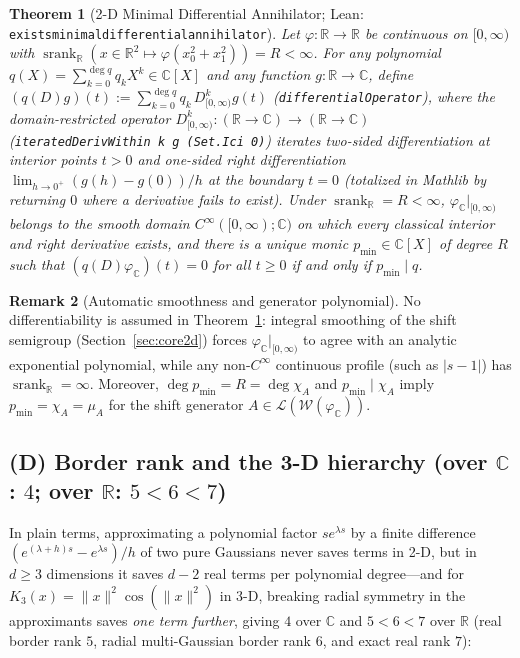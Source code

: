 \documentclass[11pt,a4paper]{article}
\theoremstyle{plain}
\newtheorem{theorem}{Theorem}[section]
\theoremstyle{definition}
\newtheorem{remark}[theorem]{Remark}
\newcommand{\R}{\mathbb{R}}
\newcommand{\C}{\mathbb{C}}
\DeclareMathOperator{\srank}{srank}
\DeclareRobustCommand{\leanid}[1]{{\def\_{\textunderscore\allowbreak}\texttt{#1}}}
\begin{document}
\begin{theorem}[2-D Minimal Differential Annihilator; Lean: \leanid{exists\_minimal\_differential\_annihilator}]\label{thm:annihilator}
Let $\varphi : \R \to \R$ be continuous on $[0,\infty)$ with $\srank_{\R}(x \in \R^2 \mapsto \varphi(x_0^2 + x_1^2)) = R < \infty$. For any polynomial $q(X) = \sum_{k=0}^{\deg q} q_k X^k \in \C[X]$ and any function $g : \R \to \C$, define $(q(D)g)(t) := \sum_{k=0}^{\deg q} q_k\, D^k_{[0,\infty)} g(t)$ (\leanid{differentialOperator}), where the domain-restricted operator $D^k_{[0,\infty)} : (\R \to \C) \to (\R \to \C)$ (\texttt{iterated\-Deriv\-Within k g (Set.Ici 0)}) iterates two-sided differentiation at interior points $t > 0$ and \emph{one-sided right differentiation} $\lim_{h \to 0^+}(g(h) - g(0))/h$ at the boundary $t = 0$ (totalized in Mathlib by returning $0$ where a derivative fails to exist). Under $\srank_{\R} = R < \infty$, $\varphi_{\C}|_{[0,\infty)}$ belongs to the smooth domain $C^\infty([0,\infty); \C)$ on which every classical interior and right derivative exists, and there is a unique monic $p_{\min} \in \C[X]$ of degree $R$ such that $(q(D)\varphi_{\C})(t) = 0$ for all $t \ge 0$ if and only if $p_{\min} \mid q$.
\end{theorem}

\begin{remark}[Automatic smoothness and generator polynomial]\label{rem:annihilator_gen}
No differentiability is assumed in Theorem~\ref{thm:annihilator}: integral smoothing of the shift semigroup (Section~\ref{sec:core2d}) forces $\varphi_{\C}|_{[0,\infty)}$ to agree with an analytic exponential polynomial, while any non-$C^\infty$ continuous profile (such as $|s - 1|$) has $\srank_{\R} = \infty$. Moreover, $\deg p_{\min} = R = \deg\chi_A$ and $p_{\min} \mid \chi_A$ imply $p_{\min} = \chi_A = \mu_A$ for the shift generator $A \in \mathcal{L}(\mathcal{W}(\varphi_{\C}))$.
\end{remark}

\subsection{(D) Border rank and the 3-D hierarchy (over \texorpdfstring{$\C$: $4$; over $\R$: $5 < 6 < 7$}{C: 4; over R: 5 < 6 < 7})}\label{sec:res_border}

In plain terms, approximating a polynomial factor $s e^{\lambda s}$ by a finite difference $(e^{(\lambda+h)s} - e^{\lambda s})/h$ of two pure Gaussians never saves terms in 2-D, but in $d \ge 3$ dimensions it saves $d - 2$ real terms per polynomial degree---and for $K_3(x) = \|x\|^2\cos(\|x\|^2)$ in 3-D, breaking radial symmetry in the approximants saves \emph{one term further}, giving $4$ over $\C$ and $5 < 6 < 7$ over $\R$ (real border rank $5$, radial multi-Gaussian border rank $6$, and exact real rank $7$):
\end{document}
